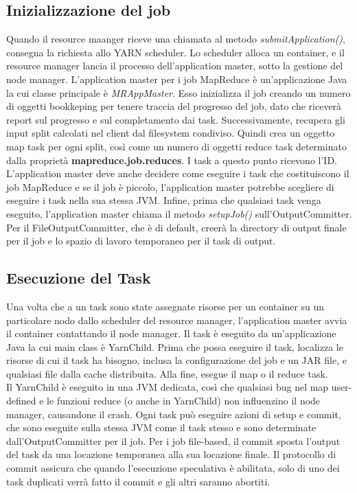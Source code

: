 \subsection{Inizializzazione del job}
Quando il resource maanger riceve una chiamata al metodo \textit{submitApplication()}, consegna la richiesta allo YARN scheduler. Lo scheduler alloca un container, e il resource manager lancia il processo dell'application master, sotto la gestione del node manager. L'application master per i job MapReduce è un'applicazione Java la cui classe principale è \textit{MRAppMaster}. Esso inizializza il job creando un numero di oggetti bookkeping per tenere traccia del progresso del job, dato che riceverà report sul progresso e sul completamento dai task. Successivamente, recupera gli input split calcolati nel client dal filesystem condiviso. Quindi crea un oggetto map task per ogni split, così come un numero di oggetti reduce task determinato dalla proprietà \textbf{mapreduce.job.reduces}. I task a questo punto ricevono l'ID. L'application master deve anche decidere come eseguire i task che costituiscono il job MapReduce e se il job è piccolo, l'application master potrebbe scegliere di eseguire i task nella sua stessa JVM. Infine, prima che qualsiasi task venga eseguito, l'application master chiama il metodo \textit{setupJob()} sull'OutputCommitter. Per il FileOutputCommitter, che è di default, creerà la directory di output finale per il job e lo spazio di lavoro temporaneo per il task di output.
\subsection{Esecuzione del Task}
Una volta che a un task sono state assegnate risorse per un container su un particolare nodo dallo scheduler del resource manager, l'application master avvia il container contattando il node manager. Il task è eseguito da un'applicazione Java la cui main class è YarnChild. Prima che possa eseguire il task, localizza le risorse di cui il task ha bisogno, inclusa la configurazione del job e un JAR file, e qualsiasi file dalla cache distribuita. Alla fine, esegue il map o il reduce task. \\
Il YarnChild è eseguito in una JVM dedicata, così che qualsiasi bug nel map user-defined e le funzioni reduce (o anche in YarnChild) non influenzino il node manager, causandone il crash.\newline
Ogni task può eseguire azioni di setup e commit, che sono eseguite sulla stessa JVM come il task stesso e sono determinate dall'OutputCommitter per il job. Per i job file-based, il commit sposta l'output del task da una locazione temporanea alla sua locazione finale. Il protocollo di commit assicura che quando l'esecuzione speculativa è abilitata, solo di uno dei task duplicati verrà fatto il commit e gli altri saranno abortiti.
